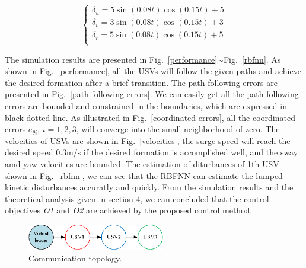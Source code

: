 \documentclass[english]{cccconf}
\begin{document}
\begin{equation}
	\left\{
	\begin{aligned}
		\delta_{u}=5\sin(0.08t)\cos(0.15t)+5\\
		\delta_{v}=3\sin(0.08t)\cos(0.15t)+3\\
		\delta_{r}=5\sin(0.08t)\cos(0.15t)+5\\
	\end{aligned}
	\right.
\end{equation}

The simulation results are presented in Fig.~\ref{performance}$\sim$Fig.~\ref{rbfnn}. As shown in Fig.~\ref{performance}, all the USVs will follow the given paths and achieve the desired formation after a brief transition. The path following errors are presented in Fig.~\ref{path following errors}. We can easily get all the path following errors are bounded and constrained in the boundaries, which are expressed in black dotted line. As illustrated in Fig.~\ref{coordinated errors}, all the coordinated errors $e_{\theta i}$, $i=1,2,3$, will converge into the small neighborhood of zero. The velocities of USVs are shown in Fig.~\ref{velocities}, the surge speed will reach the desired speed 0.3m/s if the desired formation is accomplished well, and the sway amd yaw velocities are bounded. The estimation of diturbances of 1th USV shown in Fig.~\ref{rbfnn}, we can see that the RBFNN can estimate the lumped kinetic disturbances accuratly and quickly. From the simulation results and the theoretical analysis given in section 4, we can concluded that the control objectives \emph{O1} and \emph{O2} are achieved by the proposed control method.

\begin{figure}[!htb]
	\centering
	\includegraphics[width=6cm]{communication.eps}
	\caption{Communication topology.}
	\label{communication}
\end{figure}
\end{document}

